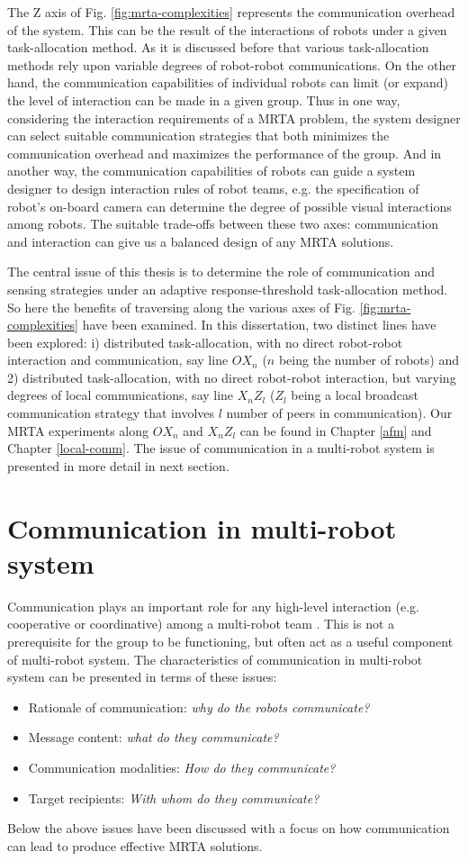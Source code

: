 The Z axis of Fig. \ref{fig:mrta-complexities} represents the communication overhead of the system. This can be the result of the interactions  of robots under a given task-allocation method. As it is discussed before that various task-allocation methods rely upon variable degrees of robot-robot communications.  On the other hand, the communication capabilities of individual robots can limit (or expand) the level of interaction can be made  in a given group. Thus in one way, considering the interaction requirements of a MRTA problem, the system designer can  select suitable communication strategies that both minimizes the communication overhead and maximizes the performance of the group. And in another way, the communication capabilities of robots can guide a system designer to design interaction rules of robot teams, e.g. the specification of robot's on-board camera  can determine the degree of possible visual interactions among robots. The suitable trade-offs between these two axes: communication and interaction can give us a balanced design of any MRTA solutions.

The central issue of this thesis is to determine the role of communication and sensing strategies under an adaptive response-threshold task-allocation method. So here the benefits of traversing along the various axes of Fig. \ref{fig:mrta-complexities} have been examined. In this dissertation, two distinct lines have been explored: i) distributed task-allocation, with no direct robot-robot interaction and communication, say line $OX_{n}$ ($n$ being the number of robots)  and 2) distributed task-allocation, with no direct robot-robot interaction, but varying degrees of local communications, say line $X_{n}Z_{l}$  ($Z_{l}$ being a local broadcast communication strategy that involves $l$ number of peers in communication). Our MRTA experiments along $OX_{n}$ and $X_{n}Z_{l}$ can be found in Chapter \ref{afm} and Chapter \ref{local-comm}. The issue of  communication in a multi-robot system is presented in more detail in next section.
\section{Communication in multi-robot system}
\label{bg:mrs-comm}
Communication plays an important role for any high-level interaction (e.g. cooperative or coordinative) among a multi-robot team \cite{Arkin1998}. This is not a prerequisite for the group to be functioning, but often act as a useful component of multi-robot system. The characteristics of communication in multi-robot system can be presented in terms of these issues:
\begin{itemize}
\item Rationale of communication: {\em why do the robots communicate?} 
\item Message content: {\em what do they communicate?} 
\item Communication modalities: {\em How do they communicate?} 
\item Target recipients: {\em With whom do they communicate?}
\end{itemize}
Below the above issues have been discussed with a focus on how communication  can lead to produce effective MRTA solutions.
